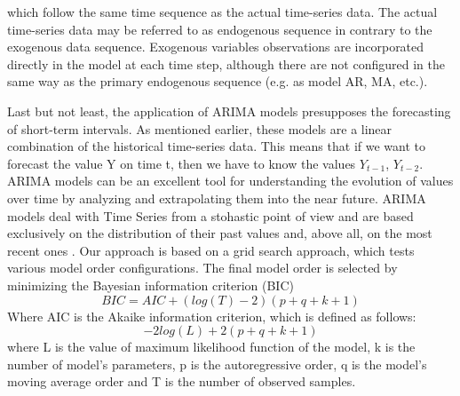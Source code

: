 which follow the same time sequence as the actual time-series data. The actual time-series data may be referred to as endogenous sequence in contrary to the exogenous data sequence. Exogenous variables observations are incorporated directly in the model at each time step, although there are not configured in the same way as the primary endogenous sequence (e.g. as model AR, MA, etc.).
\par Last but not least, the application of ARIMA models presupposes the forecasting of short-term intervals. As mentioned earlier, these models are a linear combination of the historical time-series data. This means that if
we want to forecast the value Y on time t, then we have to know the values $Y_{t-1}$, $Y_{t-2}$. ARIMA models can be an excellent tool for understanding the evolution of values over time by analyzing and extrapolating them into the near future. ARIMA models deal with Time Series from a stohastic point of view and are based exclusively on the distribution of their past values and, above all, on the most recent ones \cite{arunraj2016application}. Our approach is based on a grid search approach, which tests
various model order configurations. The final model order is selected by
minimizing the Bayesian information criterion (BIC)
$$ BIC = AIC + (log(T) − 2)(p + q + k + 1)$$
Where AIC is the Akaike information criterion, which is defined as follows:
$$− 2log(L) + 2(p + q + k + 1)$$
where L is the value of maximum likelihood function of the model, k is the
number of model's parameters, p is the autoregressive order, q is
the model's moving average order and T is the number of observed samples. 
